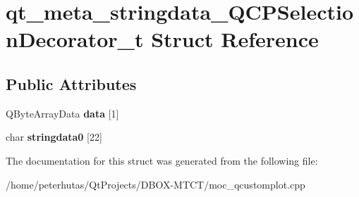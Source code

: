 \hypertarget{structqt__meta__stringdata___q_c_p_selection_decorator__t}{}\section{qt\+\_\+meta\+\_\+stringdata\+\_\+\+Q\+C\+P\+Selection\+Decorator\+\_\+t Struct Reference}
\label{structqt__meta__stringdata___q_c_p_selection_decorator__t}
\subsection*{Public Attributes}
\begin{DoxyCompactItemize}
\item 
\mbox{\label{structqt__meta__stringdata___q_c_p_selection_decorator__t_a1afefbcc9caf562bf85a48bef4fdd12a}} 
Q\+Byte\+Array\+Data {\bfseries data} \mbox{[}1\mbox{]}
\item 
\mbox{\label{structqt__meta__stringdata___q_c_p_selection_decorator__t_a396f24ff22a1439774cf0634b5080197}} 
char {\bfseries stringdata0} \mbox{[}22\mbox{]}
\end{DoxyCompactItemize}


The documentation for this struct was generated from the following file\+:\begin{DoxyCompactItemize}
\item 
/home/peterhutas/\+Qt\+Projects/\+D\+B\+O\+X-\/\+M\+T\+C\+T/moc\+\_\+qcustomplot.\+cpp\end{DoxyCompactItemize}

